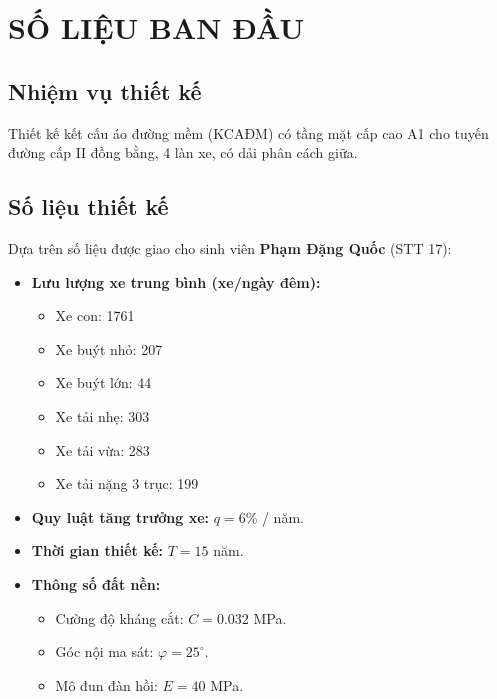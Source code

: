 \section{SỐ LIỆU BAN ĐẦU}

\subsection{Nhiệm vụ thiết kế}
Thiết kế kết cấu áo đường mềm (KCAĐM) có tầng mặt cấp cao A1 cho tuyến đường cấp II đồng bằng, 4 làn xe, có dải phân cách giữa.

\subsection{Số liệu thiết kế}
Dựa trên số liệu được giao cho sinh viên \textbf{Phạm Đặng Quốc} (STT 17):

\begin{itemize}
    \item \textbf{Lưu lượng xe trung bình (xe/ngày đêm):}
    \begin{itemize}
        \item Xe con: 1761
        \item Xe buýt nhỏ: 207
        \item Xe buýt lớn: 44
        \item Xe tải nhẹ: 303
        \item Xe tải vừa: 283
        \item Xe tải nặng 3 trục: 199
    \end{itemize}
    \item \textbf{Quy luật tăng trưởng xe:} $q = 6\%$ / năm.
    \item \textbf{Thời gian thiết kế:} $T = 15$ năm.
    \item \textbf{Thông số đất nền:}
    \begin{itemize}
        \item Cường độ kháng cắt: $C = 0.032$ MPa.
        \item Góc nội ma sát: $\varphi = 25^\circ$.
        \item Mô đun đàn hồi: $E = 40$ MPa.
    \end{itemize}
\end{itemize}
